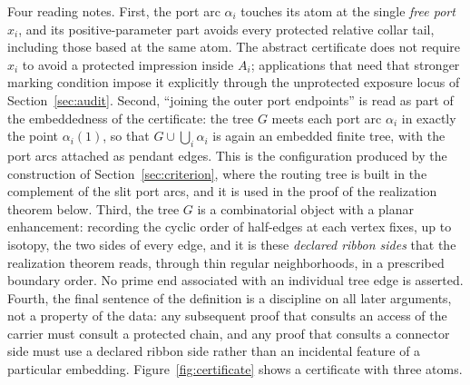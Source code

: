 Four reading notes.  First, the port arc $\alpha_i$ touches its atom at
the single \emph{free port} $x_i$, and its positive-parameter part avoids
every protected relative collar tail, including those based at the same
atom.  The abstract certificate does not require $x_i$ to avoid a protected
impression inside $A_i$; applications that need that stronger marking
condition impose it explicitly through the unprotected exposure locus of
Section~\ref{sec:audit}.  Second, ``joining the outer port
endpoints'' is read as part of the embeddedness of the certificate: the
tree $G$ meets each port arc $\alpha_i$ in exactly the point
$\alpha_i(1)$, so that $G\cup\bigcup_i\alpha_i$ is again an embedded
finite tree, with the port arcs attached as pendant edges.  This is the
configuration produced by the construction of
Section~\ref{sec:criterion}, where the routing tree is built in the
complement of the slit port arcs, and it is used in the proof of the
realization theorem below.  Third, the tree $G$ is a
combinatorial object with a planar enhancement: recording the cyclic order
of half-edges at each vertex fixes, up to isotopy, the two sides of every
edge, and it is these \emph{declared ribbon sides} that the realization
theorem reads, through thin regular neighborhoods, in a prescribed
boundary order.  No prime end associated with an individual tree edge is
asserted.
Fourth, the final sentence of the definition is a discipline on all later
arguments, not a property of the data: any subsequent proof that consults
an access of the carrier must consult a protected chain, and any proof that
consults a connector side must use a declared ribbon side rather than an
incidental feature of a particular embedding.  Figure~\ref{fig:certificate} shows a
certificate with three atoms.

